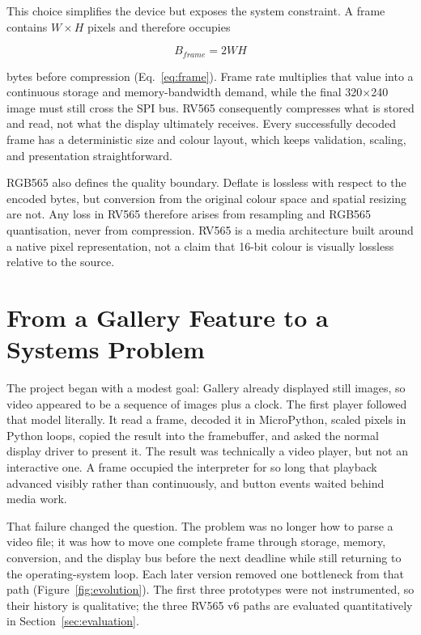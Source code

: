 \documentclass[11pt,twocolumn]{article}
\newcommand{\system}{RV565}
\begin{document}
This choice simplifies the device but exposes the system constraint.  A frame
contains $W\times H$ pixels and therefore occupies

\begin{equation}
B_{frame}=2WH
\label{eq:frame}
\end{equation}

bytes before compression (Eq.~\eqref{eq:frame}).  Frame rate multiplies that
value into a continuous storage and memory-bandwidth demand, while the final
320$\times$240 image must still cross the SPI bus.  \system{} consequently
compresses what is stored and read, not what the display ultimately receives.
Every successfully decoded frame has a deterministic size and colour layout,
which keeps validation, scaling, and presentation straightforward.

RGB565 also defines the quality boundary.  Deflate is lossless with respect to
the encoded bytes, but conversion from the original colour space and spatial
resizing are not.  Any loss in \system{} therefore arises from resampling and
RGB565 quantisation, never from compression.  \system{} is a media
architecture built around a native pixel representation, not a claim that
16-bit colour is visually lossless relative to the source.

\section{From a Gallery Feature to a Systems Problem}

The project began with a modest goal: Gallery already displayed still images,
so video appeared to be a sequence of images plus a clock.  The first player
followed that model literally.  It read a frame, decoded it in MicroPython,
scaled pixels in Python loops, copied the result into the framebuffer, and
asked the normal display driver to present it.  The result was technically a
video player, but not an interactive one.  A frame occupied the interpreter
for so long that playback advanced visibly rather than continuously, and
button events waited behind media work.

That failure changed the question.  The problem was no longer how to parse a
video file; it was how to move one complete frame through storage, memory,
conversion, and the display bus before the next deadline while still returning
to the operating-system loop.  Each later version removed one bottleneck from
that path (Figure~\ref{fig:evolution}).  The first three prototypes were not
instrumented, so their history is qualitative; the three \system{} v6 paths
are evaluated quantitatively in Section~\ref{sec:evaluation}.
\end{document}
